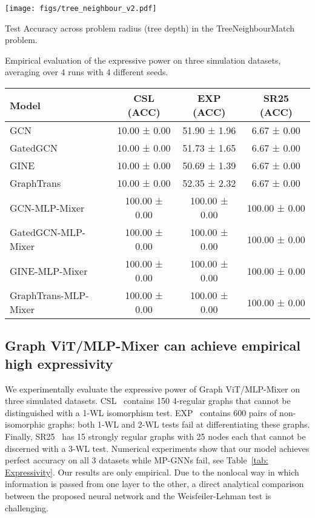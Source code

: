 \documentclass{article}
\begin{document}
  \begin{minipage}{\textwidth}
  \begin{minipage}[c]{0.48\textwidth}
    \centering
      \texttt{[image: figs/tree\_neighbour\_v2.pdf]}
      \captionsetup{type=figure}
    \caption{Test Accuracy across problem radius (tree depth) in the TreeNeighbourMatch problem.}
    \label{fig: tree neighbour}
  \end{minipage}
  \hfill
  \begin{minipage}[c]{0.50\textwidth}
  \captionsetup{type=table}
  \caption{Empirical evaluation of the expressive power on three simulation datasets, averaging over 4 runs with 4 different seeds.}
  \label{tab: Expressivity}
  \scriptsize
    \centering
    \begin{tabular}{lccc}
    \toprule
    Model & CSL (ACC)& EXP (ACC) & SR25 (ACC) \\
    \midrule
    GCN & 10.00 ± 0.00 & 51.90 ± 1.96 & 6.67 ± 0.00\\
    GatedGCN & 10.00 ± 0.00 & 51.73 ± 1.65& 6.67 ± 0.00\\
    GINE & 10.00 ± 0.00 & 50.69 ± 1.39&6.67 ± 0.00\\
    GraphTrans& 10.00 ± 0.00 & 52.35 ± 2.32 &6.67 ± 0.00\\
    \midrule
         {GCN-MLP-Mixer} & 100.00 ± 0.00 & 100.00 ± 0.00 & 100.00 ± 0.00  \\
         {GatedGCN-MLP-Mixer} & 100.00 ± 0.00 & 100.00 ± 0.00 & 100.00 ± 0.00  \\
         {GINE-MLP-Mixer} & 100.00 ± 0.00 & 100.00 ± 0.00 & 100.00 ± 0.00  \\
         {GraphTrans-MLP-Mixer}& 100.00 ± 0.00 & 100.00 ± 0.00 & 100.00 ± 0.00  \\
         \bottomrule
    \end{tabular}
    \end{minipage}
  \end{minipage}
\subsection{Graph ViT/MLP-Mixer can achieve empirical high expressivity}



    
We experimentally evaluate the expressive power of Graph ViT/MLP-Mixer on three simulated datasets. CSL~\citep{murphy2019relational} contains 150 4-regular graphs that cannot be distinguished with a 1-WL isomorphism test. EXP~\citep{EXP} contains 600 pairs of non-isomorphic graphs: both 1-WL and 2-WL tests fail at differentiating these graphs. Finally, SR25~\citep{balcilar2021breaking} has 15 strongly regular graphs with 25 nodes each that cannot be discerned with a 3-WL test.  Numerical experiments show that our model 
achieves perfect accuracy on all 3 datasets while MP-GNNs fail, see Table~\ref{tab: Expressivity}. Our results are only empirical. Due to the nonlocal way in which information is passed from one layer to the other, a direct analytical comparison between the proposed neural network and the Weisfeiler-Lehman test is challenging.
\end{document}
